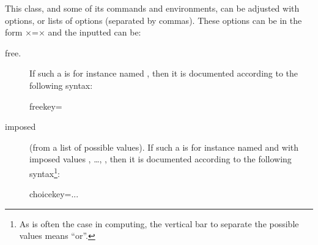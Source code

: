 \documentclass[english,nolocaltoc]{nwejmart}
\newtheorem[style=definition]{fact}
\newtheorem[title-plural=Criteria]{criterion}
\newtheorem[title=random experiment]{rexp}
\begin{document}
This class, and some of its commands and environments, can be adjusted
with options, or lists of options (separated by commas). These options
can be in the form ×=×  and the inputted
 can be:
\begin{description}
\item[free.] If such a  is for instance named
  ,  then it is documented according to the following syntax: 
  \begin{docKey*}{freekey}{=}{}
  \end{docKey*}
\item[imposed] (from a list of possible values). If such a 
  is for instance named   and with imposed values
  , \dots{}, ,  then it is
  documented according to the following syntax\footnote{As is often
    the case in computing, the vertical bar to separate the possible
    values means \enquote{or}.}:
  \begin{docKey*}{choicekey}{=\textbar...\textbar{}}{}
  \end{docKey*}
\end{description}
\end{document}
